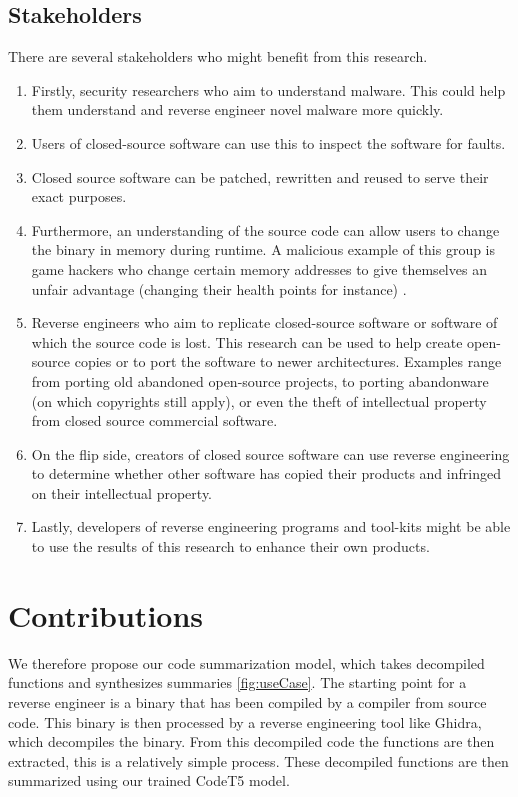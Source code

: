 \subsection{Stakeholders}
There are several stakeholders who might benefit from this research. 
\begin{enumerate}
    \item Firstly, security researchers who aim to understand malware. This could help them understand and reverse engineer novel malware more quickly.
    \item Users of closed-source software can use this to inspect the software for faults.
    \item Closed source software can be patched, rewritten and reused to serve their exact purposes.
    \item Furthermore, an understanding of the source code can allow users to change the binary in memory during runtime. A malicious example of this group is game hackers who change certain memory addresses to give themselves an unfair advantage (changing their health points for instance) \cite{TypeInferenceSurvey}. 
    \item Reverse engineers who aim to replicate closed-source software or software of which the source code is lost. This research can be used to help create open-source copies or to port the software to newer architectures. Examples range from porting old abandoned open-source projects, to porting abandonware (on which copyrights still apply), or even the theft of intellectual property from closed source commercial software.
    \item On the flip side, creators of closed source software can use reverse engineering to determine whether other software has copied their products and infringed on their intellectual property.
    \item Lastly, developers of reverse engineering programs and tool-kits might be able to use the results of this research to enhance their own products. 
\end{enumerate}

\section{Contributions}
We therefore propose our code summarization model, which takes decompiled functions and synthesizes summaries \ref{fig:useCase}. The starting point for a reverse engineer is a binary that has been compiled by a compiler from source code. This binary is then processed by a reverse engineering tool like Ghidra, which decompiles the binary. From this decompiled code the functions are then extracted, this is a relatively simple process. These decompiled functions are then summarized using our trained CodeT5 \cite{CodeT5} model.

